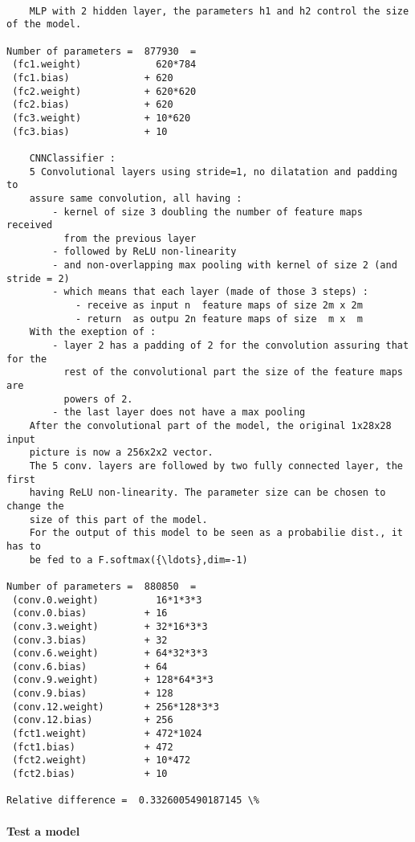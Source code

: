 \documentclass[11pt]{article}
\begin{document}
    \begin{Verbatim}[commandchars=\\\{\}]

    MLP with 2 hidden layer, the parameters h1 and h2 control the size of the model.
    
Number of parameters =  877930  =   
 (fc1.weight)             620*784
 (fc1.bias)             + 620
 (fc2.weight)           + 620*620
 (fc2.bias)             + 620
 (fc3.weight)           + 10*620
 (fc3.bias)             + 10

    CNNClassifier :
    5 Convolutional layers using stride=1, no dilatation and padding to 
    assure same convolution, all having :
        - kernel of size 3 doubling the number of feature maps received 
          from the previous layer
        - followed by ReLU non-linearity 
        - and non-overlapping max pooling with kernel of size 2 (and stride = 2)
        - which means that each layer (made of those 3 steps) :
            - receive as input n  feature maps of size 2m x 2m
            - return  as outpu 2n feature maps of size  m x  m
    With the exeption of :
        - layer 2 has a padding of 2 for the convolution assuring that for the 
          rest of the convolutional part the size of the feature maps are 
          powers of 2. 
        - the last layer does not have a max pooling
    After the convolutional part of the model, the original 1x28x28 input 
    picture is now a 256x2x2 vector.
    The 5 conv. layers are followed by two fully connected layer, the first 
    having ReLU non-linearity. The parameter size can be chosen to change the 
    size of this part of the model.
    For the output of this model to be seen as a probabilie dist., it has to 
    be fed to a F.softmax({\ldots},dim=-1)
    
Number of parameters =  880850  =   
 (conv.0.weight)          16*1*3*3
 (conv.0.bias)          + 16
 (conv.3.weight)        + 32*16*3*3
 (conv.3.bias)          + 32
 (conv.6.weight)        + 64*32*3*3
 (conv.6.bias)          + 64
 (conv.9.weight)        + 128*64*3*3
 (conv.9.bias)          + 128
 (conv.12.weight)       + 256*128*3*3
 (conv.12.bias)         + 256
 (fct1.weight)          + 472*1024
 (fct1.bias)            + 472
 (fct2.weight)          + 10*472
 (fct2.bias)            + 10

Relative difference =  0.3326005490187145 \%

    \end{Verbatim}

    \paragraph{Test a model}\label{test-a-model}
\end{document}
